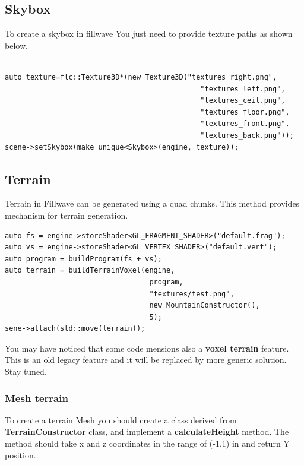 \documentclass{article}
\begin{document}
\subsection{Skybox}\label{sec:Skybox}

\indent \indent To create a skybox in fillwave You just need to provide texture paths as shown below.

\begin{lstlisting}

auto texture=flc::Texture3D*(new Texture3D("textures_right.png",
                                              "textures_left.png",
                                              "textures_ceil.png",
                                              "textures_floor.png",
                                              "textures_front.png",
                                              "textures_back.png"));
scene->setSkybox(make_unique<Skybox>(engine, texture));
\end{lstlisting}

\subsection{Terrain}\label{sec:Terrain}
\indent \indent Terrain in Fillwave can be generated using a quad chunks. This method provides mechanism for terrain generation.


\begin{lstlisting}
auto fs = engine->storeShader<GL_FRAGMENT_SHADER>("default.frag");
auto vs = engine->storeShader<GL_VERTEX_SHADER>("default.vert");
auto program = buildProgram(fs + vs);
auto terrain = buildTerrainVoxel(engine,
                                  program,
                                  "textures/test.png",
                                  new MountainConstructor(),
                                  5);
sene->attach(std::move(terrain));
\end{lstlisting}

\indent You may have noticed that some code mensions also a \textbf{voxel terrain} feature. This is an old legacy feature and it will be replaced by more generic solution. Stay tuned.

\subsubsection{Mesh terrain}\label{sec:MeshTerrain}
\indent \indent To create a terrain Mesh you should create a class derived from \textbf{TerrainConstructor} class, and implement a \textbf{calculateHeight} method. The method should take x and z coordinates in the range of (-1,1) in and return Y position.
\end{document}
